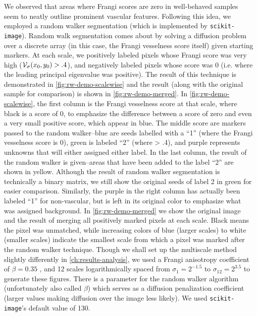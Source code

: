 We observed that areas where Frangi scores are zero in well-behaved samples seem to neatly outline prominent vascular features. Following this idea, we employed a random walker segmentation \cite{Grady-Random-Walks} (which is implemented by \texttt{scikit-image}). Random walk segmentation comes about by solving a diffusion problem over a discrete array (in this case, the Frangi vesselness score itself) given starting markers. At each scale, we positively labeled pixels whose Frangi score was very high ($\mathcal{V}_{\sigma}(x_0,y_0) > .4$), and negatively labeled pixels whose score was $0$ (i.e. where the leading principal eigenvalue was positive). The result of this technique is demonstrated in \cref{fig:rw-demo-scalewise} and the result (along with the original sample for comparison) is shown in \cref{fig:rw-demo-merged}.
In \cref{fig:rw-demo-scalewise}, the first column is the Frangi vesselness score at that scale, where black is a score of 0, to emphasize the difference between a score of zero and even a very small positive score, which appear in blue. The middle score are markers passed to the random walker--blue are seeds labelled with a ``1'' (where the Frangi vesselness score is 0), green is labeled ``2'' (where \Vmax > .4), and purple represents unknowns that will either assigned either label. In the last column, the result of the random walker is given--areas that have been added to the label ``2'' are shown in yellow. Although the result of random walker segmentation is technically a binary matrix, we still show the original seeds of label 2 in green for easier comparison. Similarly, the purple in the right column has actually been labeled ``1'' for non-vascular, but is left in its original color to emphasize what was assigned background. In \cref{fig:rw-demo-merged} we show the original image and the result of merging all positively marked pixels at each scale. Black means the pixel was unmatched, while increasing colors of blue (larger scales) to white (smaller scales) indicate the smallest scale from which a pixel was marked after the random walker technique.  Though we shall set up the multiscale method slightly differently in \cref{ch:results-analysis}, we used a Frangi anisotropy coefficient of $\beta=0.35$ , and 12 scales logarithmically spaced from $\sigma_1 = 2^{-1.5} $ to $\sigma_{12} = 2^{3.5}$ to generate these figures. There is a parameter for the random walker algorithm (unfortunately also called $\beta$) which serves as a diffusion penalization coefficient (larger values making diffusion over the image less likely). We used \texttt{scikit-image}'s default value of 130. 


